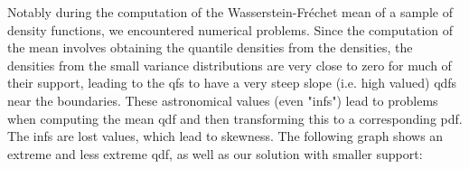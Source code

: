 Notably during the computation of the Wasserstein-Fréchet mean of a sample of density
functions, we encountered numerical problems. Since the computation of the mean involves
obtaining the quantile densities from the densities, the densities from the small
variance distributions are very close to zero for much of their support, leading to the
qfs to have a very steep slope (i.e. high valued) qdfs near the boundaries. These
astronomical values (even "infs") lead to problems when computing the mean qdf and then
transforming this to a corresponding pdf. The infs are lost values, which lead to skewness.
The following graph shows an extreme and less extreme qdf, as well as our solution with
smaller support:
